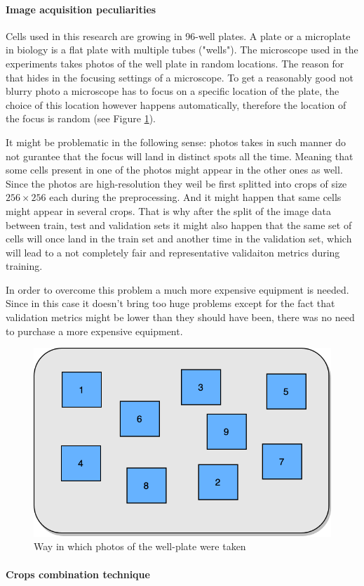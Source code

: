 \paragraph{Image acquisition peculiarities} 
    Cells used in this research are growing in 96-well plates. A plate or a microplate in biology is a flat plate with multiple tubes ("wells"). The microscope used in the experiments takes photos of the well plate in random locations. The reason for that hides in the focusing settings of a  microscope. To get a reasonably good not blurry photo a microscope has to focus on a specific location of the plate, the choice of this location however happens automatically, therefore the location of the focus is random (see Figure \ref{fig:random-dic}). 
    
    It might be problematic in the following sense: photos takes in such manner do not gurantee that the focus will land in distinct spots all the time. Meaning that some cells present in one of the photos might appear in the other ones as well. Since the photos are high-resolution they weil be first splitted into crops of size $256 \times 256$ each during the preprocessing. And it might happen that same cells might appear in several crops. That is why after the split of the image data between train, test and validation sets it might also happen that the same set of cells will once land in the train set and another time in the validation set, which will lead to a not completely fair and representative validaiton metrics during training.
    
    In order to overcome this problem a much more expensive equipment is needed. Since in this case it doesn't bring too huge problems except for the fact that validation metrics might be lower than they should have been, there was no need to purchase a more expensive equipment.   
    
    \begin{figure}[htb]
        \begin{center}
            \includegraphics[width=0.3\linewidth]{bilder/dic-random.png}
            \caption{Way in which photos of the well-plate were taken}\label{fig:random-dic}
        \end{center}
    \end{figure}    
\paragraph{Crops combination technique}
    